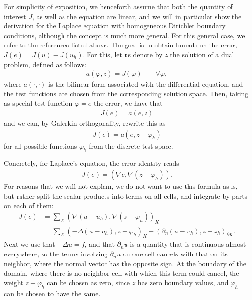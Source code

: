 \documentclass{article}
\begin{document}
For simplicity of exposition, we henceforth assume that both the quantity of
interest $J$, as well as the equation are linear, and we will in particular
show the derivation for the Laplace equation with homogeneous Dirichlet
boundary conditions, although the concept is much more general. For this
general case, we refer to the references listed above.  The goal is to obtain
bounds on the error, $J(e)=J(u)-J(u_h)$. For this, let us denote by $z$ the
solution of a dual problem, defined as follows:
\begin{gather}
  a(\varphi,z) = J(\varphi) \qquad \forall \varphi,
\end{gather}
where $a(\cdot,\cdot)$ is the bilinear form associated with the differential
equation, and the test functions are chosen from the corresponding solution
space. Then, taking as special test function $\varphi=e$ the error, we have
that
\begin{gather}
  J(e) = a(e,z)
\end{gather}
and we can, by Galerkin orthogonality, rewrite this as
\begin{gather}
  J(e) = a(e,z-\varphi_h)
\end{gather}
for all possible functions $\varphi_h$ from the discrete test space.

Concretely, for Laplace's equation, the error identity reads
\begin{gather}
  J(e) = (\nabla e, \nabla(z-\varphi_h)).
\end{gather}
For reasons that we will not explain, we do not want to use this formula as
is, but rather split the scalar products into terms on all cells, and
integrate by parts on each of them:
\begin{align*}
  J(e)
  &=
  \sum_K (\nabla (u-u_h), \nabla (z-\varphi_h))_K
  \\
  &=
  \sum_K (-\Delta (u-u_h), z-\varphi_h)_K
  + (\partial_n (u-u_h), z-z_h)_{\partial K}.
\end{align*}
Next we use that $-\Delta u=f$, and that $\partial_n u$ is a quantity that is
continuous almost everywhere, so the terms involving $\partial_n u$ on one
cell cancels with that on its neighbor, where the normal vector has the
opposite sign. At the boundary of the domain, where there is no neighbor cell
with which this term could cancel, the weight $z-\varphi_h$ can be chosen as
zero, since $z$ has zero boundary values, and $\varphi_h$ can be chosen to
have the same.
\end{document}
